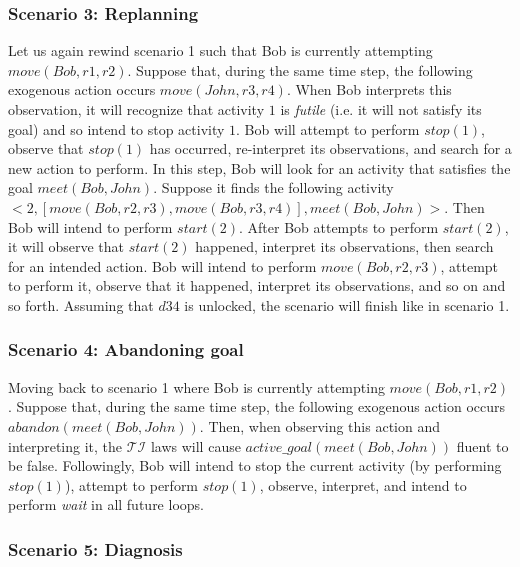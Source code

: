 \subsubsection{Scenario 3: Replanning~\cite{blount_towards_2014}}
\label{subsubsec:aia_scenario_3}

Let us again rewind scenario 1 such that Bob is currently attempting $move(Bob, r1, r2)$.
Suppose that, during the same time step, the following exogenous action occurs $move(John, r3, r4)$.
When Bob interprets this observation, it will recognize that activity $1$ is \textit{futile} (i.e. it will not satisfy its goal) and so intend to stop activity $1$.
Bob will attempt to perform $stop(1)$, observe that $stop(1)$ has occurred, re-interpret its observations, and search for a new action to perform.
In this step, Bob will look for an activity that satisfies the goal $meet(Bob, John)$.
Suppose it finds the following activity $<2, [move(Bob, r2,r3), move(Bob, r3,r4)],meet(Bob,John)>$.
Then Bob will intend to perform $start(2)$.
After Bob attempts to perform $start(2)$, it will observe that $start(2)$ happened, interpret its observations, then search for an intended action.
Bob will intend to perform $move(Bob, r2,r3)$, attempt to perform it, observe that it happened, interpret its observations, and so on and so forth.
Assuming that $d34$ is unlocked, the scenario will finish like in scenario 1.

\subsubsection{Scenario 4: Abandoning goal~\cite{blount_towards_2014}}
\label{subsubsec:aia_scenario_4}

Moving back to scenario 1 where Bob is currently attempting $move(Bob, r1, r2)$.
Suppose that, during the same time step, the following exogenous action occurs $abandon(meet(Bob, John))$.
Then, when observing this action and interpreting it, the $\mathcal{TI}$ laws will cause $active\_goal(meet(Bob, John))$ fluent to be false.
Followingly, Bob will intend to stop the current activity (by performing $stop(1)$), attempt to perform $stop(1)$, observe, interpret, and intend to perform \textit{wait} in all future loops.

\subsubsection{Scenario 5: Diagnosis~\cite{blount_towards_2014}}
\label{subsubsec:aia_scenario_5}

